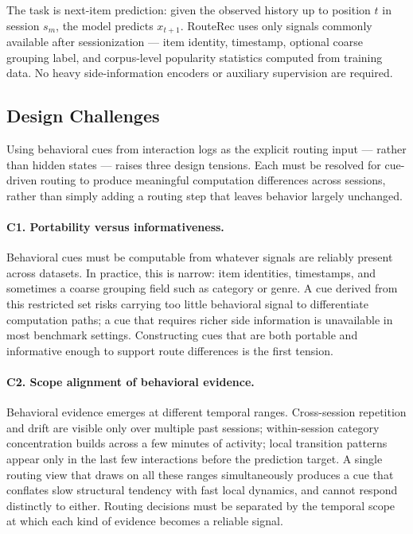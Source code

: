 \documentclass[sigconf,review,anonymous]{acmart}
\begin{document}
The task is next-item prediction: given the observed history up to position $t$ in session $s_m$, the model predicts $x_{t+1}$. RouteRec uses only signals commonly available after sessionization — item identity, timestamp, optional coarse grouping label, and corpus-level popularity statistics computed from training data. No heavy side-information encoders or auxiliary supervision are required.

\subsection{Design Challenges}
Using behavioral cues from interaction logs as the explicit routing input — rather than hidden states — raises three design tensions. Each must be resolved for cue-driven routing to produce meaningful computation differences across sessions, rather than simply adding a routing step that leaves behavior largely unchanged.

\paragraph{\textbf{C1. Portability versus informativeness.}}
Behavioral cues must be computable from whatever signals are reliably present across datasets. In practice, this is narrow: item identities, timestamps, and sometimes a coarse grouping field such as category or genre. A cue derived from this restricted set risks carrying too little behavioral signal to differentiate computation paths; a cue that requires richer side information is unavailable in most benchmark settings. Constructing cues that are both portable and informative enough to support route differences is the first tension.

\paragraph{\textbf{C2. Scope alignment of behavioral evidence.}}
Behavioral evidence emerges at different temporal ranges. Cross-session repetition and drift are visible only over multiple past sessions; within-session category concentration builds across a few minutes of activity; local transition patterns appear only in the last few interactions before the prediction target. A single routing view that draws on all these ranges simultaneously produces a cue that conflates slow structural tendency with fast local dynamics, and cannot respond distinctly to either. Routing decisions must be separated by the temporal scope at which each kind of evidence becomes a reliable signal.
\end{document}
